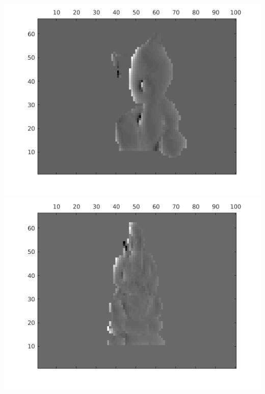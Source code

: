 \includegraphics[width=.4\linewidth]{imagenes/gato_small_dephs_789.png}
\includegraphics[width=.4\linewidth]{imagenes/buda_small_dephs_789.png}